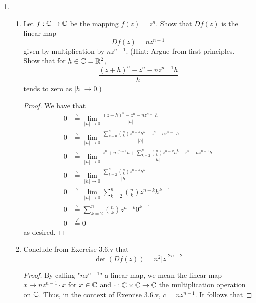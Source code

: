 \documentclass[../psets.tex]{subfiles}
\begin{document}
\begin{enumerate}[label={\textbf{3.6.\roman*.}}]
\begin{proof}
        \begin{equation*}
            \det[\mathcal{M}(f)] = (a)(a)-(-b)(b)
            = a^2+b^2
            = \left( \sqrt{a^2+b^2} \right)^2
            = |c|^2
        \end{equation*}
        as desired.
    \end{proof}
    \item 
    \begin{enumerate}
        \item Let $f:\mathbb{C}\to\mathbb{C}$ be the mapping $f(z)=z^n$. Show that $Df(z)$ is the linear map
        \begin{equation*}
            Df(z) = nz^{n-1}
        \end{equation*}
        given by multiplication by $nz^{n-1}$. (Hint: Argue from first principles. Show that for $h\in\mathbb{C}=\mathbb{R}^2$,
        \begin{equation*}
            \frac{(z+h)^n-z^n-nz^{n-1}h}{|h|}
        \end{equation*}
        tends to zero as $|h|\to 0$.)
        \begin{proof}
            We have that
            \begin{align*}
                0 &\stackrel{?}{=} \lim_{|h|\to 0}\frac{(z+h)^n-z^n-nz^{n-1}h}{|h|}\\
                0 &\stackrel{?}{=} \lim_{|h|\to 0}\frac{\sum_{k=0}^n\binom{n}{k}z^{n-k}h^k-z^n-nz^{n-1}h}{|h|}\\
                0 &\stackrel{?}{=} \lim_{|h|\to 0}\frac{z^n+nz^{n-1}h+\sum_{k=2}^n\binom{n}{k}z^{n-k}h^k-z^n-nz^{n-1}h}{|h|}\\
                0 &\stackrel{?}{=} \lim_{|h|\to 0}\frac{\sum_{k=2}^n\binom{n}{k}z^{n-k}h^k}{|h|}\\
                0 &\stackrel{?}{=} \lim_{|h|\to 0}\sum_{k=2}^n\binom{n}{k}z^{n-k}h^{k-1}\\
                0 &\stackrel{?}{=} \sum_{k=2}^n\binom{n}{k}z^{n-k}0^{k-1}\\
                0 &\stackrel{\checkmark}{=} 0
            \end{align*}
            as desired.
        \end{proof}
        \item Conclude from Exercise 3.6.v that
        \begin{equation*}
            \det(Df(z)) = n^2|z|^{2n-2}
        \end{equation*}
        \begin{proof}
            By calling "$nz^{n-1}$" a linear map, we mean the linear map $x\mapsto nz^{n-1}\cdot x$ for $x\in\mathbb{C}$ and $\cdot:\mathbb{C}\times\mathbb{C}\to\mathbb{C}$ the multiplication operation on $\mathbb{C}$. Thus, in the context of Exercise 3.6.v, $c=nz^{n-1}$. It follows that

\end{proof}
\end{enumerate}
\end{enumerate}
\end{document}

